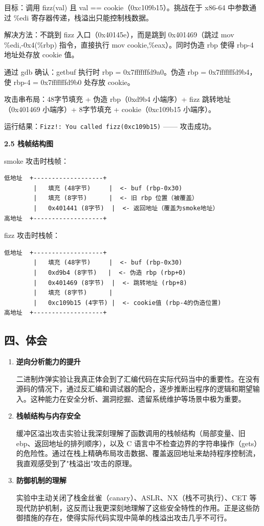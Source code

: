 \documentclass[12pt,a4paper]{ctexart}
\begin{document}
目标：调用 fizz(val) 且 val == cookie（0xc109b15）。挑战在于 x86-64 中参数通过 \%edi 寄存器传递，栈溢出只能控制栈数据。

解决方法：不跳到 fizz 入口（0x40145e），而是跳到 0x401469（跳过 mov \%edi,-0x4(\%rbp) 指令，直接执行 mov cookie,\%eax）。同时伪造 rbp 使得 rbp-4 地址处存放 cookie 值。

通过 gdb 确认：getbuf 执行时 rbp = 0x7fffffffd9a0。伪造 rbp = 0x7fffffffd9b4，使 rbp-4 = 0x7fffffffd9b0 处存放 cookie。

攻击串布局：48字节填充 + 伪造 rbp（0xd9b4 小端序）+ fizz 跳转地址（0x401469 小端序）+ 8字节填充 + cookie（0xc109b15 小端序）。

运行结果：\texttt{Fizz!: You called fizz(0xc109b15)} —— 攻击成功。

\textbf{2.5 栈帧结构图}

smoke 攻击时栈帧：
\begin{lstlisting}
低地址  +-------------------+
        |   填充 (48字节)     |  <- buf (rbp-0x30)
        |   填充 (8字节)      |  <- 旧 rbp 位置（被覆盖）
        |   0x401441 (8字节)  |  <- 返回地址（覆盖为smoke地址）
高地址  +-------------------+
\end{lstlisting}

fizz 攻击时栈帧：
\begin{lstlisting}
低地址  +-------------------+
        |   填充 (48字节)     |  <- buf (rbp-0x30)
        |   0xd9b4 (8字节)   |  <- 伪造 rbp (rbp+0)
        |   0x401469 (8字节)  |  <- 跳转地址 (rbp+8)
        |   填充 (8字节)      |
        |   0xc109b15 (4字节) |  <- cookie值 (rbp-4的伪造位置)
高地址  +-------------------+
\end{lstlisting}

\subsection*{四、体会}

\begin{enumerate}[label=\arabic*.]
    \item \textbf{逆向分析能力的提升}

    二进制炸弹实验让我真正体会到了汇编代码在实际代码当中的重要性。在没有源码的情况下，通过反汇编和调试器的配合，逐步推断出程序的逻辑和期望输入。这种能力在安全分析、漏洞挖掘、遗留系统维护等场景中极为重要。

    \item \textbf{栈帧结构与内存安全}

    缓冲区溢出攻击实验让我深刻理解了函数调用的栈帧结构（局部变量、旧ebp、返回地址的排列顺序），以及 C 语言中不检查边界的字符串操作（gets）的危险性。通过在栈上精确布局攻击数据、覆盖返回地址来劫持程序控制流，我直观感受到了"栈溢出"攻击的原理。

    \item \textbf{防御机制的理解}

    实验中主动关闭了栈金丝雀（canary）、ASLR、NX（栈不可执行）、CET 等现代防护机制，这反而让我更深刻地理解了这些安全特性的作用。正是这些防御措施的存在，使得实际代码实现中简单的栈溢出攻击几乎不可行。

\end{enumerate}
\end{document}

